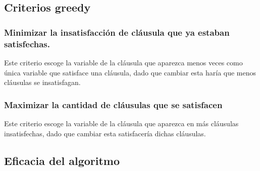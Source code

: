 \documentclass[article]{llncs}
\begin{document}
\subsection{Criterios greedy}

\subsubsection{Minimizar la insatisfacción de cláusula que ya estaban satisfechas.}

Este criterio escoge la variable de la cláusula que aparezca menos veces como única variable que satisface una cláusula, dado que cambiar esta
haría que menos cláusulas se insatisfagan.

\subsubsection{Maximizar la cantidad de cláusulas que se satisfacen}

Este criterio escoge la variable de la cláusula que aparezca en más cláusulas insatisfechas, dado que cambiar esta satisfacería
dichas cláusulas.

\subsection{Eficacia del algoritmo}
\end{document}
